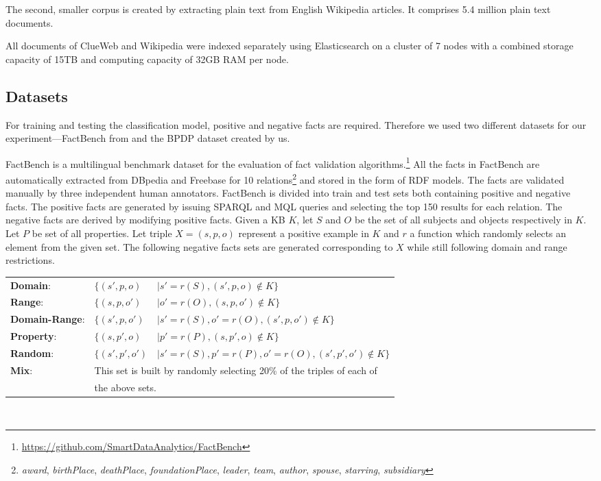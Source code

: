 The second, smaller corpus is created by extracting plain text from English Wikipedia articles. It comprises 5.4 million plain text documents. 

All documents of ClueWeb and Wikipedia were indexed separately using Elasticsearch on a cluster of 7 nodes with a combined storage capacity of 15TB and computing capacity of 32GB RAM per node.

\subsection{Datasets}\label{subsec:Datasets}

For training and testing the classification model, positive and negative facts are required. Therefore we used two different datasets for our experiment---FactBench from \cite{gerber2015defacto} and the BPDP dataset created by us.

FactBench is a multilingual benchmark dataset for the evaluation of fact validation algorithms\cite{gerber2015defacto}.\footnote{\url{https://github.com/SmartDataAnalytics/FactBench}} All the facts in FactBench are automatically extracted from DBpedia and Freebase for 10 relations\footnote{\textit{award}, \textit{birthPlace}, \textit{deathPlace}, \textit{foundationPlace}, \textit{leader}, \textit{team}, \textit{author}, \textit{spouse}, \textit{starring}, \textit{subsidiary}} and stored in the form of RDF models. The facts are validated manually by three independent human annotators. FactBench is divided into train and test sets both containing positive and negative facts. The positive facts are generated by issuing SPARQL and MQL queries and selecting the top 150 results for each relation. The negative facts are derived by modifying positive facts. Given a KB $K$, let $S$ and $O$ be the set of all subjects and objects respectively in $K$. Let $P$ be set of all properties. Let triple $X=(s,p,o)$ represent a positive example in $K$ and $r$ a function which randomly selects an element from the given set. The following negative facts sets are generated corresponding to $X$ while still following domain and range restrictions.\\
\begin{tabular*}{\textwidth}{@{}lll@{}}
\textbf{Domain}: & $\{(s', p, o) $&$\mid s'=r(S), (s', p, o) \notin K \}$ \\
\textbf{Range}: & $\{(s, p, o') $&$\mid o'=r(O), (s, p, o') \notin K \}$ \\
\textbf{Domain-Range}: & $\{(s', p, o') $&$\mid s'=r(S), o'=r(O), (s', p, o') \notin K \}$ \\
\textbf{Property}: & $\{(s, p', o) $&$\mid p'=r(P), (s, p', o) \notin K \}$ \\
\textbf{Random}: & $\{(s', p', o') $&$\mid s'=r(S), p'=r(P), o'=r(O), (s', p', o') \notin K \}$ \\
\textbf{Mix}: & \multicolumn{2}{l}{This set is built by randomly selecting 20\% of the triples of each of}\\
              & \multicolumn{2}{l}{the above sets.} \\
\end{tabular*}\\

